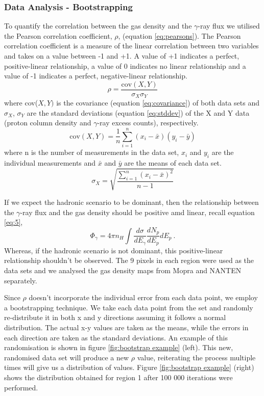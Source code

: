 \documentclass[12pt,a4paper]{article}
\begin{document}
\subsubsection{Data Analysis - Bootstrapping}
To quantify the correlation between the gas density and the $\gamma$-ray flux we utilised the Pearson correlation coefficient, $\rho$, (equation \ref{eq:pearsons}). The Pearson correlation coefficient is a measure of the linear correlation between two variables and takes on a value between -1 and +1. A value of +1 indicates a perfect, positive-linear relationship, a value of 0 indicates no linear relationship and a value of -1 indicates a perfect, negative-linear relationship. 
\begin{equation}\label{eq:pearsons}
\rho = \dfrac{\mathrm{cov}(X,Y)}{\sigma_X \sigma_Y}
\end{equation}
where cov($X,Y)$ is the covariance (equation \ref{eq:covariance}) of both data sets and $\sigma_X$, $\sigma_Y$ are the standard deviations (equation \ref{eq:stddev}) of the X and Y data (proton column density and $\gamma$-ray excess counts), respectively.
\begin{equation}\label{eq:covariance}
\mathrm{cov}(X,Y) = \dfrac{1}{n} \sum_{i=1}^n (x_i - \bar{x})(y_i - \bar{y})
\end{equation}
where n is the number of measurements in the data set, $x_i$ and $y_i$ are the individual measurements and $\bar{x}$ and $\bar{y}$ are the means of each data set.
\begin{equation}\label{eq:stddev}
\sigma_X = \sqrt{\dfrac{\sum_{i=1}^n (x_i - \bar{x})^2}{n -1}}
\end{equation}

If we expect the hadronic scenario to be dominant, then the relationship between the $\gamma$-ray flux and the gas density should be positive amd linear, recall equation \ref{eq:5},
\begin{equation} 
\Phi_{\gamma} = 4 \pi n_H \int \dfrac{d\sigma}{dE_\gamma} \dfrac{dN_p}{dE_p} dE_p \ .
\end{equation}
Whereas, if the hadronic scenario is not dominant, this positive-linear relationship shouldn't be observed. 
The 9 pixels in each region were used as the data sets and we analysed the gas density maps from Mopra and NANTEN separately. 

Since $\rho$ doesn't incorporate the individual error from each data point, we employ a bootstrapping technique. We take each data point from the set and randomly re-distribute it in both x and y directions assuming it follows a normal distribution. The actual x-y values are taken as the means, while the errors in each direction are taken as the standard deviations. An example of this randomisation is shown in figure \ref{fig:bootstrap example} (left). This new, randomised data set will produce a new $\rho$ value, reiterating the process multiple times will give us a distribution of values. Figure \ref{fig:bootstrap example} (right) shows the distribution obtained for region 1 after 100 000 iterations were performed. 
\end{document}
